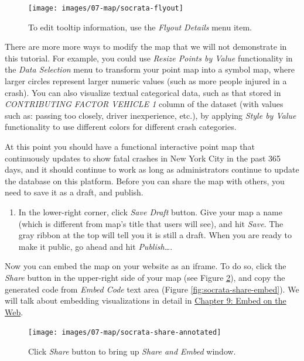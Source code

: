 \documentclass[
  english,
]{book}
\providecommand{\tightlist}{%
  \setlength{\itemsep}{0pt}\setlength{\parskip}{0pt}}
\begin{document}
\begin{figure}
\texttt{[image: images/07-map/socrata-flyout]} \caption{To edit tooltip information, use the \emph{Flyout Details} menu item.}\label{fig:socrata-flyout}
\end{figure}

There are more more ways to modify the map that we will not demonstrate in this tutorial. For example, you could use \emph{Resize Points by Value} functionality in the \emph{Data Selection} menu to transform your point map into a symbol map, where larger circles represent larger numeric values (such as more people injured in a crash). You can also visualize textual categorical data, such as that stored in \emph{CONTRIBUTING FACTOR VEHICLE 1} column of the dataset (with values such as: passing too closely, driver inexperience, etc.), by applying \emph{Style by Value} functionality to use different colors for different crash categories.

At this point you should have a functional interactive point map that continuously updates to show fatal crashes in New York City in the past 365 days, and it should continue to work as long as administrators continue to update the database on this platform. Before you can share the map with others, you need to save it as a draft, and publish.

\begin{enumerate}
\def\labelenumi{\arabic{enumi}.}
\setcounter{enumi}{9}
\tightlist
\item
  In the lower-right corner, click \emph{Save Draft} button. Give your map a name (which is different from map's title that users will see), and hit \emph{Save}. The gray ribbon at the top will tell you it is still a draft. When you are ready to make it public, go ahead and hit \emph{Publish\ldots{}}.
\end{enumerate}

Now you can embed the map on your website as an iframe. To do so, click the \emph{Share} button in the upper-right side of your map (see Figure \ref{fig:socrata-share}), and copy the generated code from \emph{Embed Code} text area (Figure \ref{fig:socrata-share-embed}). We will talk about embedding visualizations in detail in \href{embed.html}{Chapter 9: Embed on the Web}.



\begin{figure}
\texttt{[image: images/07-map/socrata-share-annotated]} \caption{Click \emph{Share} button to bring up \emph{Share and Embed} window.}\label{fig:socrata-share}
\end{figure}
\end{document}

